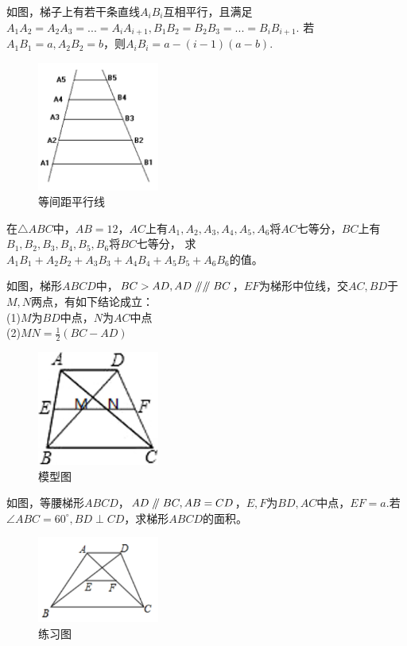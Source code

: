 \documentclass{ecnuthesis}
\newcommand\px{\mathrel{/\mkern-5mu/}}  %
\begin{document}
\begin{model}
    如图，梯子上有若干条直线$A_iB_i$互相平行，且满足$A_1A_2=A_2A_3=...=A_iA_{i+1},B_1B_2=B_2B_3=...=B_iB_{i+1}.$
    若$A_1B_1=a,A_2B_2=b$，则$A_iB_i=a-(i-1)(a-b).$
\end{model}
\begin{figure}[H]
\centering
\includegraphics[width=4cm]{picture/695.png}
\caption{等间距平行线}
\end{figure}
\begin{problem}
    在$\triangle ABC$中，$AB=12$，$AC$上有$A_1,A_2,A_3,A_4,A_5,A_6$将$AC$七等分，$BC$上有$B_1,B_2,B_3,B_4,B_5,B_6$将$BC$七等分，
    求$A_1B_1+A_2B_2+A_3B_3+A_4B_4+A_5B_5+A_6B_6$的值。
\end{problem}
\begin{model}
    如图，梯形$ABCD$中，$BC>AD,AD\px \px BC$，$EF$为梯形中位线，交$AC,BD$于$M,N$两点，有如下结论成立：\\
    (1)$M$为$BD$中点，$N$为$AC$中点 \\
    (2)$MN=\frac{1}{2}(BC-AD)$
\end{model}
\begin{figure}[H]
\centering
\includegraphics[width=4cm]{picture/696.png}
\caption{模型图}
\end{figure}
\begin{problem}
    如图，等腰梯形$ABCD$，$AD\px BC,AB=CD$，$E,F$为$BD,AC$中点，$EF=a$.若$\angle ABC=60^\circ,BD\perp CD$，求梯形$ABCD$的面积。
\end{problem}
\begin{figure}[H]
\centering
\includegraphics[width=4cm]{picture/623.png}
\caption{练习图}
\end{figure}
\end{document}
